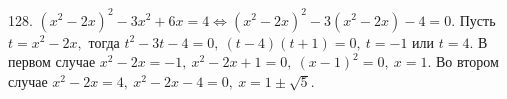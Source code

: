 128. $(x^2-2x)^2-3x^2+6x=4\Leftrightarrow (x^2-2x)^2-3(x^2-2x)-4=0.$ Пусть $t=x^2-2x,$ тогда $t^2-3t-4=0,\ (t-4)(t+1)=0,\ t=-1$ или $t=4.$ В первом случае $x^2-2x=-1,\ x^2-2x+1=0,\ (x-1)^2=0,\ x=1.$ Во втором случае $x^2-2x=4,\ x^2-2x-4=0,\ x=1\pm\sqrt{5}.$\\
